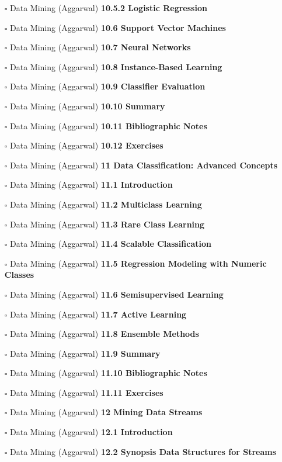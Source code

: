 \documentclass[a4, landscape, 12pt]{article}
\newcommand{\checkbox}{$\square$}%
\begin{document}
\begin{itemize}
{}
\item [\checkbox]  Data Mining (Aggarwal) \textbf{ 10.5.2 Logistic Regression
}
\item [\checkbox]  Data Mining (Aggarwal) \textbf{ 10.6 Support Vector Machines
}
\item [\checkbox]  Data Mining (Aggarwal) \textbf{ 10.7 Neural Networks
}
\item [\checkbox]  Data Mining (Aggarwal) \textbf{ 10.8 Instance-Based Learning
}
\item [\checkbox]  Data Mining (Aggarwal) \textbf{ 10.9 Classifier Evaluation
}
\item [\checkbox]  Data Mining (Aggarwal) \textbf{ 10.10 Summary
}
\item [\checkbox]  Data Mining (Aggarwal) \textbf{ 10.11 Bibliographic Notes
}
\item [\checkbox]  Data Mining (Aggarwal) \textbf{ 10.12 Exercises
}
\item [\checkbox]  Data Mining (Aggarwal) \textbf{ 11 Data Classification: Advanced Concepts
}
\item [\checkbox]  Data Mining (Aggarwal) \textbf{ 11.1 Introduction
}
\item [\checkbox]  Data Mining (Aggarwal) \textbf{ 11.2 Multiclass Learning
}
\item [\checkbox]  Data Mining (Aggarwal) \textbf{ 11.3 Rare Class Learning
}
\item [\checkbox]  Data Mining (Aggarwal) \textbf{ 11.4 Scalable Classification
}
\item [\checkbox]  Data Mining (Aggarwal) \textbf{ 11.5 Regression Modeling with Numeric Classes
}
\item [\checkbox]  Data Mining (Aggarwal) \textbf{ 11.6 Semisupervised Learning
}
\item [\checkbox]  Data Mining (Aggarwal) \textbf{ 11.7 Active Learning
}
\item [\checkbox]  Data Mining (Aggarwal) \textbf{ 11.8 Ensemble Methods
}
\item [\checkbox]  Data Mining (Aggarwal) \textbf{ 11.9 Summary
}
\item [\checkbox]  Data Mining (Aggarwal) \textbf{ 11.10 Bibliographic Notes
}
\item [\checkbox]  Data Mining (Aggarwal) \textbf{ 11.11 Exercises
}
\item [\checkbox]  Data Mining (Aggarwal) \textbf{ 12 Mining Data Streams
}
\item [\checkbox]  Data Mining (Aggarwal) \textbf{ 12.1 Introduction
}
\item [\checkbox]  Data Mining (Aggarwal) \textbf{ 12.2 Synopsis Data Structures for Streams
}
\end{itemize}
\end{document}
